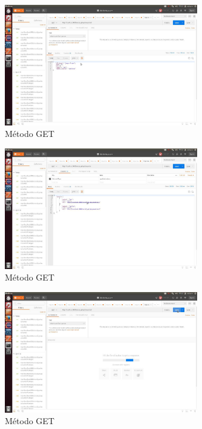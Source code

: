 \documentclass[12pt,a4paper, spanish]{article}
\begin{document}
\begin{figure}[H]
	\centering
	\includegraphics[width=0.75\textwidth]{images/captura3.jpg}
	\caption{Método GET}
\end{figure}

\begin{figure}[H]
	\centering
	\includegraphics[width=0.75\textwidth]{images/captura4.jpg}
	\caption{Método GET}
\end{figure}

\begin{figure}[H]
	\centering
	\includegraphics[width=0.75\textwidth]{images/captura5.jpg}
	\caption{Método GET}
\end{figure}
\end{document}
